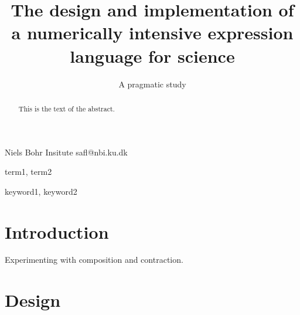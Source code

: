 \documentclass{sigplanconf}
\begin{document}
\setlength{\pdfpageheight}{\paperheight}
\setlength{\pdfpagewidth}{\paperwidth}






\title{The design and implementation of a numerically intensive expression language for science}
\subtitle{A pragmatic study}

           {Niels Bohr Insitute}
           {safl@nbi.ku.dk}

\maketitle

\begin{abstract}
This is the text of the abstract.
\end{abstract}


\terms
term1, term2

\keywords
keyword1, keyword2

\section{Introduction}

Experimenting with composition and contraction.

\section{Design}
\end{document}
